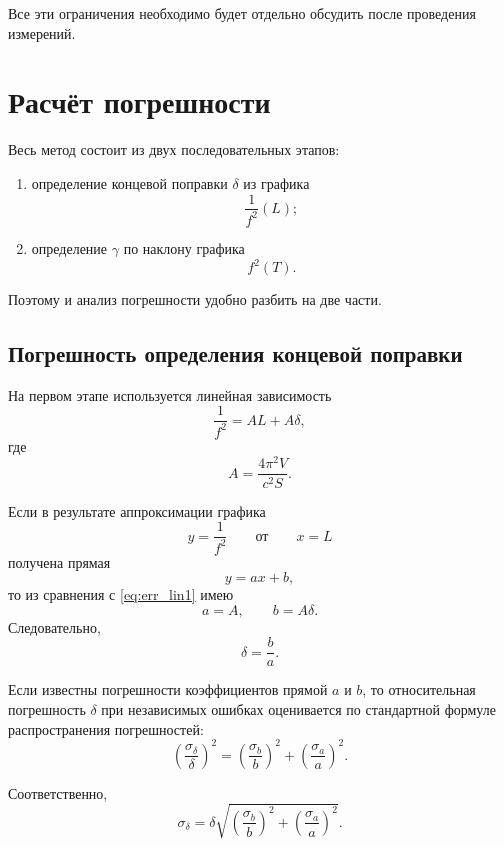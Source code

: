 \documentclass[a4paper,12pt]{article}
\begin{document}
	Все эти ограничения необходимо будет отдельно обсудить после проведения измерений.
	
	\section{Расчёт погрешности}
	
	Весь метод состоит из двух последовательных этапов:
	\begin{enumerate}[label=\arabic*)]
		\item определение концевой поправки \(\delta\) из графика
		\[
		\frac{1}{f^2}(L);
		\]
		\item определение \(\gamma\) по наклону графика
		\[
		f^2(T).
		\]
	\end{enumerate}
	
	Поэтому и анализ погрешности удобно разбить на две части.
	
	\subsection{Погрешность определения концевой поправки}
	
	На первом этапе используется линейная зависимость
	\begin{equation}
		\frac{1}{f^2}=AL+A\delta,
		\label{eq:err_lin1}
	\end{equation}
	где
	\[
	A=\frac{4\pi^2V}{c^2S}.
	\]
	
	Если в результате аппроксимации графика
	\[
	y=\frac{1}{f^2}
	\qquad \text{от} \qquad
	x=L
	\]
	получена прямая
	\[
	y=ax+b,
	\]
	то из сравнения с \eqref{eq:err_lin1} имею
	\[
	a=A,
	\qquad
	b=A\delta.
	\]
	Следовательно,
	\begin{equation}
		\delta=\frac{b}{a}.
		\label{eq:delta_from_ab}
	\end{equation}
	
	Если известны погрешности коэффициентов прямой \(a\) и \(b\), то относительная погрешность \(\delta\) при независимых ошибках оценивается по стандартной формуле распространения погрешностей:
	\begin{equation}
		\left(\frac{\sigma_\delta}{\delta}\right)^2
		=
		\left(\frac{\sigma_b}{b}\right)^2+
		\left(\frac{\sigma_a}{a}\right)^2.
		\label{eq:sigma_delta}
	\end{equation}
	
	Соответственно,
	\begin{equation}
		\sigma_\delta
		=
		\delta
		\sqrt{
			\left(\frac{\sigma_b}{b}\right)^2+
			\left(\frac{\sigma_a}{a}\right)^2
		}.
	\end{equation}
	
\end{document}

